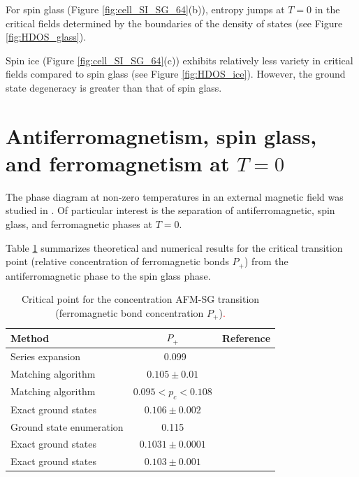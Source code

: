 \documentclass[preprint,12pt]{elsarticle}
\begin{document}
	For spin glass (Figure \ref{fig:cell_SI_SG_64}(b)), entropy jumps at $T=0$ in the critical fields determined by the boundaries of the density of states (see Figure \ref{fig:HDOS_glass}).
	
	Spin ice (Figure \ref{fig:cell_SI_SG_64}(c)) exhibits relatively less variety in critical fields compared to spin glass (see Figure \ref{fig:HDOS_ice}). However, the ground state degeneracy is greater than that of spin glass.
	
	
	\section{Antiferromagnetism, spin glass, and ferromagnetism at $T = 0$}
	
	The phase diagram at non-zero temperatures in an external magnetic field was studied in \cite{trukhin2024thermodynamic}. Of particular interest is the separation of antiferromagnetic, spin glass, and ferromagnetic phases at $T = 0$.
	
	Table \ref{tab:lit_phase} summarizes theoretical and numerical results for the critical transition point (relative concentration of ferromagnetic bonds $P_+$) from the antiferromagnetic phase to the spin glass phase.
	
	\begin{table}[!h]
		\centering
		\begin{tabular}{|l|c|l|}
			\hline
			Method & \( P_{+} \) & Reference \\ \hline
			Series expansion & ~0.099 & \cite{PhysRevB.19.260} \\ \hline
			Matching algorithm & \( 0.105 \pm 0.01 \) & \cite{H_Freund_1989} \\ \hline
			Matching algorithm & \( 0.095 < p_c < 0.108 \) & \cite{BENDISCH1994139} \\ \hline
			Exact ground states & \( 0.106 \pm 0.002 \) & \cite{N.Kawashima_1997} \\ \hline
			Ground state enumeration & 0.115 & \cite{PhysRevE.58.1502} \\ \hline
			Exact ground states & \( 0.1031 \pm 0.0001 \) & \cite{WANG200331} \\ \hline
			Exact ground states & \( 0.103 \pm 0.001 \) & \cite{amoruso2004domain} \\ \hline
		\end{tabular}
		\caption{Critical point for the concentration AFM-SG transition (ferromagnetic bond concentration $ P_+ $)\textcolor{red}{.}}
		\label{tab:lit_phase}
	\end{table}
	
\end{document}
